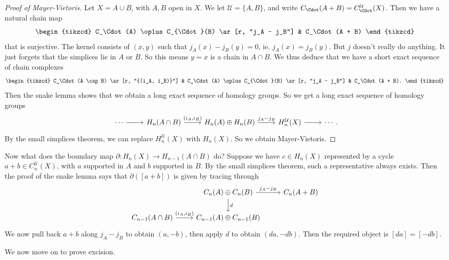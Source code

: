 \documentclass[a4paper]{article}
\begin{document}
\begin{proof}[Proof of Mayer-Vietoris]
  Let $X = A \cup B$, with $A, B$ open in $X$. We let $\mathcal{U} = \{A, B\}$, and write $C_\Cdot(A + B) = C_\Cdot^\mathcal{U} (X)$. Then we have a natural chain map
  \[
    \begin{tikzcd}
      C_\Cdot(A) \oplus C_{\Cdot}(B) \ar[r, "j_A - j_B"] & C_\Cdot(A + B)
    \end{tikzcd}
  \]
  that is surjective. The kernel consists of $(x, y)$ such that $j_A(x) - j_B(y) = 0$, ie. $j_A(x) = j_B(y)$. But $j$ doesn't really do anything. It just forgets that the simplices lie in $A$ or $B$. So this means $y = x$ is a chain in $A \cap B$. We thus deduce that we have a short exact sequence of chain complexes
  \[
    \begin{tikzcd}
      C_\Cdot(A \cap B) \ar[r, "{(i_A, i_B)}"] & C_\Cdot(A) \oplus C_{\Cdot}(B) \ar[r, "j_A - j_B"] & C_\Cdot(A + B).
    \end{tikzcd}
  \]
  Then the snake lemma shows that we obtain a long exact sequence of homology groups. So we get a long exact sequence of homology groups
  \[
    \begin{tikzcd}
      \cdots\ar[r] & H_n(A \cap B) \ar[r, "{(i_A, i_B)}"] & H_n(A) \oplus H_n(B) \ar[r, "j_A - j_B"] & H_n^\mathcal{U}(X) \ar[r] & \cdots
    \end{tikzcd}.
  \]
  By the small simplices theorem, we can replace $H_n^\mathcal{U}(X)$ with $H_n(X)$. So we obtain Mayer-Vietoris.
\end{proof}

Now what does the boundary map $\partial: H_n(X) \to H_{n - 1}(A \cap B)$ do? Suppose we have $c \in H_n(X)$ represented by a cycle $a + b \in C_n^\mathcal{U}(X)$, with $a$ supported in $A$ and $b$ supported in $B$. By the small simplices theorem, such a representative always exists. Then the proof of the snake lemma says that $\partial([a + b])$ is given by tracing through
\[
  \begin{tikzcd}
    & C_n(A) \oplus C_n(B) \ar[r, "j_A - j_B"] \ar[d, "d"] & C_n(A + B)\\
    C_{n - 1}(A \cap B) \ar[r, "{(i_A, i_B)}"] & C_{n - 1}(A) \oplus C_{n - 1}(B)
  \end{tikzcd}
\]
We now pull back $a + b$ along $j_A - j_B$ to obtain $(a, -b)$, then apply $d$ to obtain $(da, -db)$. Then the required object is $[da] = [-db]$.

We now move on to prove excision.
\end{document}
